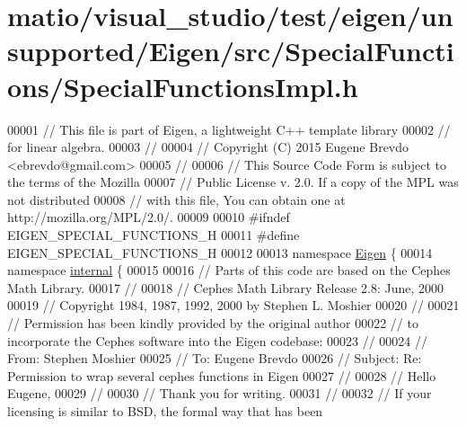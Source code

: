 \hypertarget{matio_2visual__studio_2test_2eigen_2unsupported_2_eigen_2src_2_special_functions_2_special_functions_impl_8h_source}{}\section{matio/visual\+\_\+studio/test/eigen/unsupported/\+Eigen/src/\+Special\+Functions/\+Special\+Functions\+Impl.h}
\label{matio_2visual__studio_2test_2eigen_2unsupported_2_eigen_2src_2_special_functions_2_special_functions_impl_8h_source}

\begin{DoxyCode}
00001 \textcolor{comment}{// This file is part of Eigen, a lightweight C++ template library}
00002 \textcolor{comment}{// for linear algebra.}
00003 \textcolor{comment}{//}
00004 \textcolor{comment}{// Copyright (C) 2015 Eugene Brevdo <ebrevdo@gmail.com>}
00005 \textcolor{comment}{//}
00006 \textcolor{comment}{// This Source Code Form is subject to the terms of the Mozilla}
00007 \textcolor{comment}{// Public License v. 2.0. If a copy of the MPL was not distributed}
00008 \textcolor{comment}{// with this file, You can obtain one at http://mozilla.org/MPL/2.0/.}
00009 
00010 \textcolor{preprocessor}{#ifndef EIGEN\_SPECIAL\_FUNCTIONS\_H}
00011 \textcolor{preprocessor}{#define EIGEN\_SPECIAL\_FUNCTIONS\_H}
00012 
00013 \textcolor{keyword}{namespace }\hyperlink{namespace_eigen}{Eigen} \{
00014 \textcolor{keyword}{namespace }\hyperlink{namespaceinternal}{internal} \{
00015 
00016 \textcolor{comment}{//  Parts of this code are based on the Cephes Math Library.}
00017 \textcolor{comment}{//}
00018 \textcolor{comment}{//  Cephes Math Library Release 2.8:  June, 2000}
00019 \textcolor{comment}{//  Copyright 1984, 1987, 1992, 2000 by Stephen L. Moshier}
00020 \textcolor{comment}{//}
00021 \textcolor{comment}{//  Permission has been kindly provided by the original author}
00022 \textcolor{comment}{//  to incorporate the Cephes software into the Eigen codebase:}
00023 \textcolor{comment}{//}
00024 \textcolor{comment}{//    From: Stephen Moshier}
00025 \textcolor{comment}{//    To: Eugene Brevdo}
00026 \textcolor{comment}{//    Subject: Re: Permission to wrap several cephes functions in Eigen}
00027 \textcolor{comment}{//}
00028 \textcolor{comment}{//    Hello Eugene,}
00029 \textcolor{comment}{//}
00030 \textcolor{comment}{//    Thank you for writing.}
00031 \textcolor{comment}{//}
00032 \textcolor{comment}{//    If your licensing is similar to BSD, the formal way that has been}

\end{DoxyCode}
